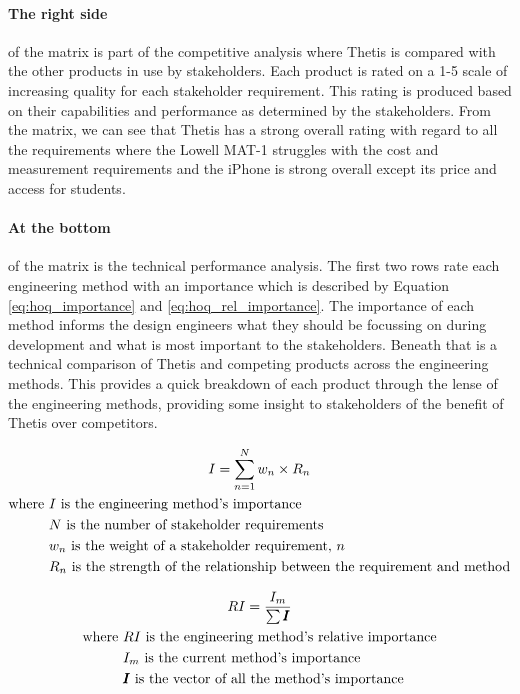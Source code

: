 \paragraph*{The right side} of the matrix is part of the competitive analysis where Thetis is compared with the other products in use by stakeholders.
Each product is rated on a 1-5 scale of increasing quality for each stakeholder requirement.
This rating is produced based on their capabilities and performance as determined by the stakeholders.
From the matrix, we can see that Thetis has a strong overall rating with regard to all the requirements where the Lowell MAT-1 struggles with the cost and measurement requirements and the iPhone is strong overall except its price and access for students.

\paragraph*{At the bottom} of the matrix is the technical performance analysis.
The first two rows rate each engineering method with an importance which is described by Equation \ref{eq:hoq_importance} and \ref{eq:hoq_rel_importance}.
The importance of each method informs the design engineers what they should be focussing on during development and what is most important to the stakeholders.
Beneath that is a technical comparison of Thetis and competing products across the engineering methods.
This provides a quick breakdown of each product through the lense of the engineering methods, providing some insight to stakeholders of the benefit of Thetis over competitors.

\begin{gather}
	\labeq{hoq_importance}
	I = \sum_{n=1}^N{w_n \times R_n} \\
	\begin{aligned}
		\text{where } &I \text{ is the engineering method's importance} \\
					  &N \text{ is the number of stakeholder requirements} \\
					  &w_n \text{ is the weight of a stakeholder requirement, } n \\
					  &R_n \text{ is the strength of the relationship between the requirement and method}
	\end{aligned} \notag
\end{gather}

\begin{gather}
	\labeq{hoq_rel_importance}
	RI = \frac{I_m}{\sum{\pmb{I}}} \\
	\begin{aligned}
		\text{where } &RI \text{ is the engineering method's relative importance} \\
					  &I_m \text{ is the current method's importance} \\
					  &\pmb{I} \text{ is the vector of all the method's importance} \\
	\end{aligned} \notag
\end{gather}

